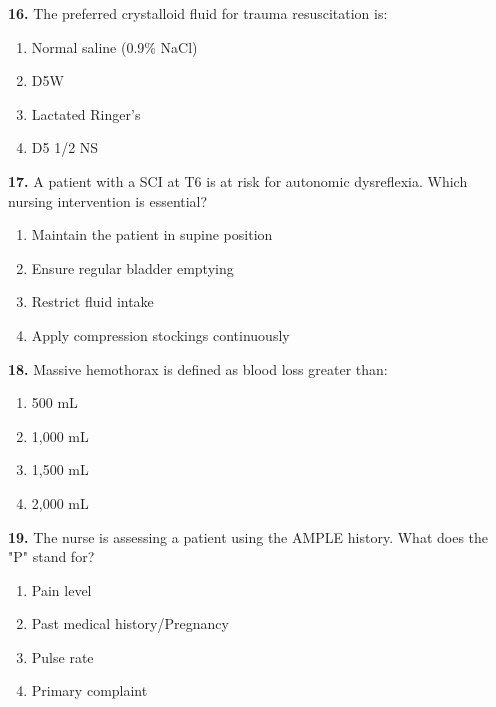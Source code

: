 \documentclass[11pt]{article}
\begin{document}
\vspace{0.3cm}

\textbf{16.} The preferred crystalloid fluid for trauma resuscitation is:

\begin{enumerate}[label=\Alph*.]
    \item Normal saline (0.9\% NaCl)
    \item D5W
    \item Lactated Ringer's
    \item D5 1/2 NS
\end{enumerate}

\vspace{0.3cm}

\textbf{17.} A patient with a SCI at T6 is at risk for autonomic dysreflexia. Which nursing intervention is essential?

\begin{enumerate}[label=\Alph*.]
    \item Maintain the patient in supine position
    \item Ensure regular bladder emptying
    \item Restrict fluid intake
    \item Apply compression stockings continuously
\end{enumerate}

\vspace{0.3cm}

\textbf{18.} Massive hemothorax is defined as blood loss greater than:

\begin{enumerate}[label=\Alph*.]
    \item 500 mL
    \item 1,000 mL
    \item 1,500 mL
    \item 2,000 mL
\end{enumerate}

\vspace{0.3cm}

\textbf{19.} The nurse is assessing a patient using the AMPLE history. What does the "P" stand for?

\begin{enumerate}[label=\Alph*.]
    \item Pain level
    \item Past medical history/Pregnancy
    \item Pulse rate
    \item Primary complaint
\end{enumerate}
\end{document}
